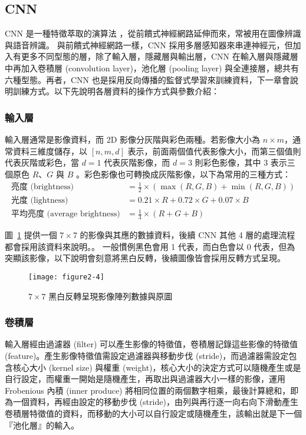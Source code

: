 \documentclass[12pt, a4paper]{article} 				%
\begin{document}
\subsection{CNN}
CNN 是一種特徵萃取的演算法 \cite{Hijazi2015UsingCN,Oshea2015}，從前饋式神經網路延伸而來，常被用在圖像辨識與語音辨識。 與前饋式神經網路一樣，CNN 採用多層感知器來串連神經元，但加入有更多不同型態的層，除了輸入層，隱藏層與輸出層，CNN 在輸入層與隱藏層中再加入卷積層 (convolution layer)，池化層 (pooling layer) 與全連接層，總共有六種型態。再者，CNN 也是採用反向傳播的監督式學習來訓練資料，下一章會說明訓練方式。以下先說明各層資料的操作方式與參數介紹：

\subsubsection{輸入層}
輸入層通常是影像資料，而 2D 影像分灰階與彩色兩種。若影像大小為 $n\times m$，通常資料三維度儲存，以 $[n, m, d]$ 表示，前面兩個值代表影像大小，而第三個值則代表灰階或彩色，當 $d=1$ 代表灰階影像，而 $d=3$ 則彩色影像，其中 3 表示三個原色 $R$、$G$ 與 $B$ 。彩色影像也可轉換成灰階影像，以下為常用的三種方式：
\begin{align*}
\mbox{亮度 (brightness)}&=\frac{1}{2}\times (\max(R,G,B)+\min(R,G,B))\\
\mbox{光度 (lightness)}&=0.21\times R+0.72\times G+0.07\times B\\
\mbox{平均亮度 (average brightness)}&=\frac{1}{3}\times (R+G+B)
\end{align*}

圖~\ref{Figure2-4} 提供一個 $7\times 7$ 的影像與其應的數據資料，後續 CNN 其他 4 層的處理流程都會採用該資料來說明。。 一般慣例黑色會用 1 代表，而白色會以 0 代表，但為突顯該影像，以下說明會刻意將黑白反轉，後續圖像皆會採用反轉方式呈現。

\begin{figure}[!ht]
\begin{center}
\texttt{[image: figure2-4]}
\caption{$7\times 7$ 黑白反轉呈現影像陣列數據與原圖}\label{Figure2-4}
\end{center}
\end{figure}

\subsubsection{卷積層}
輸入層經由過濾器 (filter) 可以產生影像的特徵值，卷積層記錄這些影像的特徵值 (feature)。產生影像特徵值需設定過濾器與移動步伐  (stride)，而過濾器需設定包含核心大小 (kernel size) 與權重 (weight)，核心大小的決定方式可以隨機產生或是自行設定，而權重一開始是隨機產生，再取出與過濾器大小一樣的影像，運用 Frobenious 內積 (inner produce) 將相同位置的兩個數字相乘，最後計算總和，即為一個資料，再經由設定的移動步伐  (stride)，由列與再行逐一向右向下滑動產生卷積層特徵值的資料，而移動的大小可以自行設定或隨機產生，該輸出就是下一個『池化層』的輸入。
 
\end{document}
